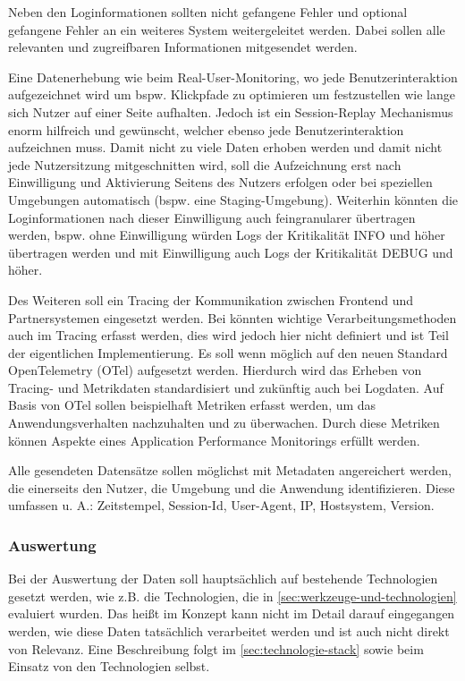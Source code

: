 	Neben den Loginformationen sollten nicht gefangene Fehler und optional gefangene Fehler an ein weiteres System weitergeleitet werden. Dabei sollen alle relevanten und zugreifbaren Informationen mitgesendet werden.
		
	Eine Datenerhebung wie beim Real-User-Monitoring, wo jede Benutzerinteraktion aufgezeichnet wird um bspw. Klickpfade zu optimieren um festzustellen wie lange sich Nutzer auf einer Seite aufhalten. Jedoch ist ein Session-Replay Mechanismus enorm hilfreich und gewünscht, welcher ebenso jede Benutzerinteraktion aufzeichnen muss. Damit nicht zu viele Daten erhoben werden und damit nicht jede Nutzersitzung mitgeschnitten wird, soll die Aufzeichnung erst nach Einwilligung und Aktivierung Seitens des Nutzers erfolgen oder bei speziellen Umgebungen automatisch (bspw. eine Staging-Umgebung). Weiterhin könnten die Loginformationen nach dieser Einwilligung auch feingranularer übertragen werden, bspw. ohne Einwilligung würden Logs der Kritikalität INFO und höher übertragen werden und mit Einwilligung auch Logs der Kritikalität DEBUG und höher.
		
	Des Weiteren soll ein Tracing der Kommunikation zwischen Frontend und Partnersystemen eingesetzt werden. Bei könnten wichtige Verarbeitungsmethoden auch im Tracing erfasst werden, dies wird jedoch hier nicht definiert und ist Teil der eigentlichen Implementierung. Es soll wenn möglich auf den neuen Standard OpenTelemetry (OTel) aufgesetzt werden. Hierdurch wird das Erheben von Tracing- und Metrikdaten standardisiert und zukünftig auch bei Logdaten. Auf Basis von OTel sollen beispielhaft Metriken erfasst werden, um das Anwendungsverhalten nachzuhalten und zu überwachen. Durch diese Metriken können Aspekte eines Application Performance Monitorings erfüllt werden.
		
	Alle gesendeten Datensätze sollen möglichst mit Metadaten angereichert werden, die einerseits den Nutzer, die Umgebung und die Anwendung identifizieren. Diese umfassen u. A.: Zeitstempel, Session-Id, User-Agent, IP, Hostsystem, Version.
		
	\subsubsection{Auswertung}
		
	Bei der Auswertung der Daten soll hauptsächlich auf bestehende Technologien gesetzt werden, wie z.B. die Technologien, die in \autoref{sec:werkzeuge-und-technologien} evaluiert wurden. Das heißt im Konzept kann nicht im Detail darauf eingegangen werden, wie diese Daten tatsächlich verarbeitet werden und ist auch nicht direkt von Relevanz. Eine Beschreibung folgt im \autoref{sec:technologie-stack} sowie beim Einsatz von den Technologien selbst.
		
